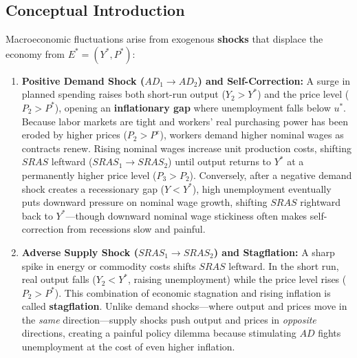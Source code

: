 \documentclass[11pt,letterpaper]{article}
\begin{document}
\subsection*{Conceptual Introduction}
Macroeconomic fluctuations arise from exogenous \textbf{shocks} that displace the economy from $E^* = (Y^*, P^*)$:
\begin{enumerate}
    \item \textbf{Positive Demand Shock ($AD_1 \rightarrow AD_2$) and Self-Correction:} A surge in planned spending raises both short-run output ($Y_2 > Y^*$) and the price level ($P_2 > P^*$), opening an \textbf{inflationary gap} where unemployment falls below $u^*$. Because labor markets are tight and workers' real purchasing power has been eroded by higher prices ($P_2 > P^e$), workers demand higher nominal wages as contracts renew. Rising nominal wages increase unit production costs, shifting $SRAS$ leftward ($SRAS_1 \rightarrow SRAS_2$) until output returns to $Y^*$ at a permanently higher price level ($P_3 > P_2$). Conversely, after a negative demand shock creates a recessionary gap ($Y < Y^*$), high unemployment eventually puts downward pressure on nominal wage growth, shifting $SRAS$ rightward back to $Y^*$—though downward nominal wage stickiness often makes self-correction from recessions slow and painful.
    \item \textbf{Adverse Supply Shock ($SRAS_1 \rightarrow SRAS_2$) and Stagflation:} A sharp spike in energy or commodity costs shifts $SRAS$ leftward. In the short run, real output falls ($Y_2 < Y^*$, raising unemployment) while the price level rises ($P_2 > P^*$). This combination of economic stagnation and rising inflation is called \textbf{stagflation}. Unlike demand shocks—where output and prices move in the \emph{same} direction—supply shocks push output and prices in \emph{opposite} directions, creating a painful policy dilemma because stimulating $AD$ fights unemployment at the cost of even higher inflation.
\end{enumerate}
\end{document}
